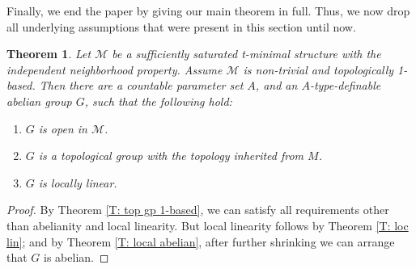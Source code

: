 \documentclass{amsart}
\newtheorem{theorem}{Theorem}[section]
\theoremstyle{definition}
\begin{document}
Finally, we end the paper by giving our main theorem in full. Thus, we now drop all underlying assumptions that were present in this section until now.

\begin{theorem}\label{T: main 1-based}
    Let $\mathcal M$ be a sufficiently saturated t-minimal structure with the independent neighborhood property. Assume $\mathcal M$ is non-trivial and topologically 1-based. Then there are a countable parameter set $A$, and an $A$-type-definable abelian group $G$, such that the following hold:
    \begin{enumerate}
        \item $G$ is open in $\mathcal M$.
        \item $G$ is a topological group with the topology inherited from $M$.
        \item $G$ is locally linear.
    \end{enumerate}
\end{theorem}
\begin{proof}
    By Theorem \ref{T: top gp 1-based}, we can satisfy all requirements other than abelianity and local linearity. But local linearity follows by Theorem \ref{T: loc lin}; and by Theorem \ref{T: local abelian}, after further shrinking we can arrange that $G$ is abelian.
\end{proof}
\end{document}
